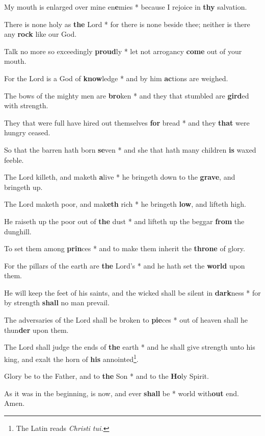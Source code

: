 \begin{multicols}{2}
	My mouth is enlarged over mine en\textbf{e}mies * because I rejoice in \textbf{thy} salvation.
	
	There is none holy as \textbf{the} Lord * for there is none beside thee; neither is there any \textbf{rock} like our God.
	
	Talk no more so exceedingly \textbf{proud}ly * let not arrogancy \textbf{come} out of your mouth.
	
	For the Lord is a God of \textbf{know}ledge * and by him \textbf{ac}tions are weighed.
	
	The bows of the mighty men are \textbf{bro}ken * and they that stumbled are \textbf{gird}ed with strength.
	
	They that were full have hired out themselves \textbf{for} bread * and they \textbf{that} were hungry ceased.
	
	So that the barren hath born \textbf{se}ven * and she that hath many children \textbf{is} waxed feeble.
	
	The Lord killeth, and maketh \textbf{a}live * he bringeth down to the \textbf{grave}, and bringeth up.
	
	The Lord maketh poor, and mak\textbf{eth} rich * he bringeth \textbf{low}, and lifteth high.
	
	He raiseth up the poor out of \textbf{the} dust * and lifteth up the beggar \textbf{from} the dunghill.
	
	To set them among \textbf{prin}ces * and to make them inherit the \textbf{throne} of glory.
	
	For the pillars of the earth are \textbf{the} Lord's * and he hath set the \textbf{world} upon them.
	
	He will keep the feet of his saints, and the wicked shall be silent in \textbf{dark}ness * for by strength \textbf{shall} no man prevail.
	
	The adversaries of the Lord shall be broken to \textbf{pie}ces * out of heaven shall he thun\textbf{der} upon them.
	
	The Lord shall judge the ends of \textbf{the} earth * and he shall give strength unto his king, and exalt the horn of \textbf{his} annointed\footnote{The Latin reads \textit{Christi tui.}}.
	
	Glory be to the Father, and to \textbf{the} Son * and to the \textbf{Ho}ly Spirit.
	
	As it was in the beginning, is now, and ever \textbf{shall} be * world with\textbf{out} end. Amen.
\end{multicols}